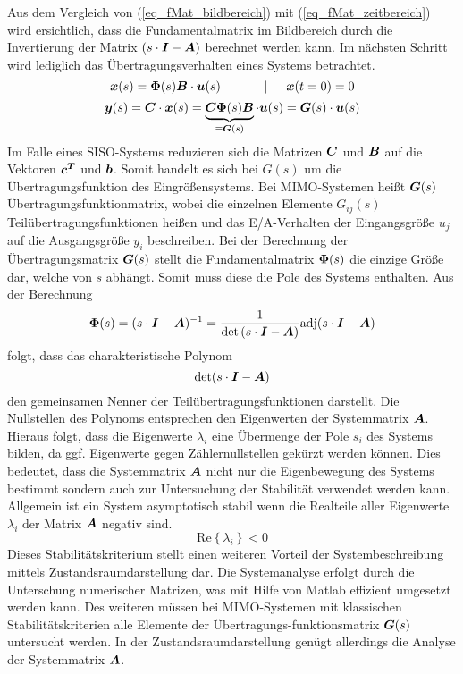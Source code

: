 Aus dem Vergleich von (\ref{eq_fMat_bildbereich}) mit (\ref{eq_fMat_zeitbereich}) wird ersichtlich, dass die Fundamentalmatrix im Bildbereich durch die Invertierung der Matrix $\left(s\cdot \boldsymbol{I}-\boldsymbol{A}\right)$ berechnet werden kann. Im nächsten Schritt wird lediglich das Übertragungsverhalten eines Systems betrachtet.
\begin{equation}
\boldsymbol{x}(s) = \boldsymbol{\Phi}(s)\boldsymbol{B}\cdot \boldsymbol{u}(s) \hspace{35pt} \vert \hspace{15pt} \boldsymbol{x}(t=0) = 0
\end{equation}
\begin{equation}
\boldsymbol{y}(s) = \boldsymbol{C}\cdot \boldsymbol{x}(s) = \underbrace{\boldsymbol{C}\boldsymbol{\Phi}(s)\boldsymbol{B}}_{\equiv \boldsymbol{G}(s)}\cdot \boldsymbol{u}(s) = \boldsymbol{G}(s)\cdot \boldsymbol{u}(s)
\end{equation}
Im Falle eines SISO-Systems reduzieren sich die Matrizen $\boldsymbol{C}$ und $\boldsymbol{B}$ auf die Vektoren $\boldsymbol{c^T}$ und $\boldsymbol{b}$. Somit handelt es sich bei $G(s)$ um die Übertragungsfunktion des Eingrößensystems. Bei MIMO-Systemen heißt $\boldsymbol{G}(s)$ Übertragungsfunktionmatrix, wobei die einzelnen Elemente $G_{ij}(s)$ Teilübertragungsfunktionen heißen und das E/A-Verhalten der Eingangsgröße $u_j$ auf die Ausgangsgröße $y_i$ beschreiben. Bei der Berechnung der Übertragungsmatrix $\boldsymbol{G}(s)$ stellt die Fundamentalmatrix $\boldsymbol{\Phi}(s)$ die einzige Größe dar, welche von $s$ abhängt. Somit muss diese die Pole des Systems enthalten. Aus der Berechnung
\begin{equation}
\boldsymbol{\Phi}(s) = (s\cdot \boldsymbol{I}-\boldsymbol{A})^{-1} = \frac{1}{\text{det}\left(s\cdot \boldsymbol{I}  - \boldsymbol{A}\right)}\text{adj}(s\cdot \boldsymbol{I} - \boldsymbol{A})
\end{equation}
folgt, dass das charakteristische Polynom
\begin{equation}
\text{det}(s\cdot \boldsymbol{I}-\boldsymbol{A})
\end{equation}
den gemeinsamen Nenner der Teilübertragungsfunktionen darstellt. Die Nullstellen des Polynoms entsprechen den Eigenwerten der Systemmatrix $\boldsymbol{A}$. Hieraus folgt, dass die Eigenwerte $\lambda_i$ eine Übermenge der Pole $s_i$ des Systems bilden, da ggf. Eigenwerte gegen  Zählernullstellen gekürzt werden können.
Dies bedeutet, dass die Systemmatrix $\boldsymbol{A}$ nicht nur die Eigenbewegung des Systems bestimmt sondern auch zur Untersuchung der Stabilität verwendet werden kann. Allgemein ist ein System asymptotisch stabil wenn die Realteile aller Eigenwerte $\lambda_i$ der Matrix $\boldsymbol{A}$ negativ sind.
\begin{equation}
\text{Re}\left\{\lambda_i\right\} < 0
\end{equation}
Dieses Stabilitätskriterium stellt einen weiteren Vorteil der Systembeschreibung mittels Zustandsraumdarstellung dar. Die Systemanalyse erfolgt durch die Unterschung numerischer Matrizen, was mit Hilfe von Matlab effizient umgesetzt werden kann. Des weiteren müssen bei MIMO-Systemen mit klassischen Stabilitätskriterien alle Elemente der Übertragungs-funktionsmatrix $\boldsymbol{G}(s)$ untersucht werden. In der Zustandsraumdarstellung genügt allerdings die Analyse der Systemmatrix $\boldsymbol{A}$.
